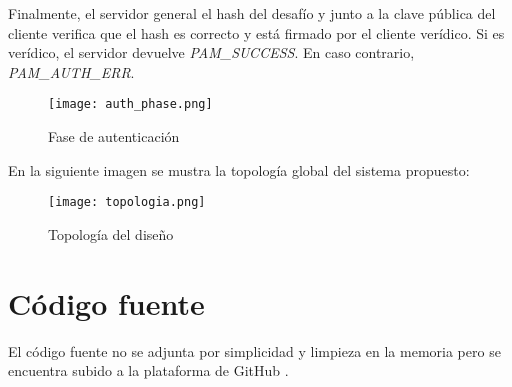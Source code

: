 Finalmente, el servidor general el hash del desafío y junto a la clave pública del cliente verifica que el hash es correcto y 
está firmado por el cliente verídico. Si es verídico, el servidor devuelve \textit{PAM\_SUCCESS}. En caso contrario, 
\textit{PAM\_AUTH\_ERR}.


\begin{figure}[H]
    \centering
    \texttt{[image: auth\_phase.png]}
    \caption{Fase de autenticación}
\end{figure}


En la siguiente imagen se mustra la topología global del sistema propuesto:

\begin{figure}[H]
    \centering
    \texttt{[image: topologia.png]}
    \caption{Topología del diseño}
\end{figure}

\section{Código fuente}

El código fuente no se adjunta por simplicidad y limpieza en la memoria pero se encuentra subido a la plataforma de GitHub 
\cite{garcia_sergiogp98mqtt-pam_2021}. 